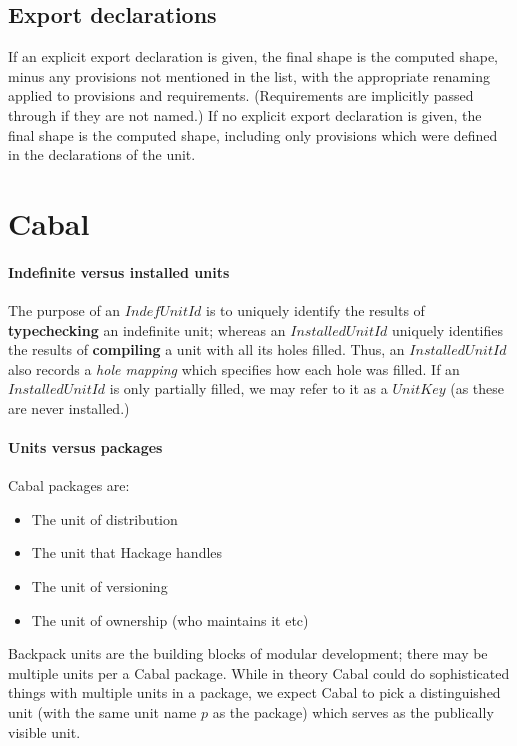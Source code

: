 \documentclass{article}
\newcommand{\I}[1]{\ensuremath{\mathit{#1}}}
\begin{document}
\subsection{Export declarations}

If an explicit export declaration is given, the final shape is the
computed shape, minus any provisions not mentioned in the list, with the
appropriate renaming applied to provisions and requirements.  (Requirements
are implicitly passed through if they are not named.)
If no explicit export declaration is given, the final shape is
the computed shape, including only provisions which were defined
in the declarations of the unit.


\section{Cabal}



\paragraph{Indefinite versus installed units}
The purpose of an \I{IndefUnitId} is to uniquely identify the results of \textbf{typechecking}
an indefinite unit; whereas an \I{InstalledUnitId} uniquely identifies
the results of \textbf{compiling} a unit with all its holes
filled.  Thus, an \I{InstalledUnitId} also records a \emph{hole mapping}
which specifies how each hole was filled.  If an \I{InstalledUnitId}
is only partially filled, we may refer to it as a \I{UnitKey} (as these
are never installed.)

\paragraph{Units versus packages}

Cabal packages are:

\begin{itemize}
    \item The unit of distribution
    \item The unit that Hackage handles
    \item The unit of versioning
    \item The unit of ownership (who maintains it etc) 
\end{itemize}

Backpack units are the building blocks of modular development;
there may be multiple units per a Cabal package.  While in theory
Cabal could do sophisticated things with multiple units in a
package, we expect Cabal
to pick a distinguished unit (with the same unit name $p$ as
the package) which serves as the publically visible unit.


\end{document}
